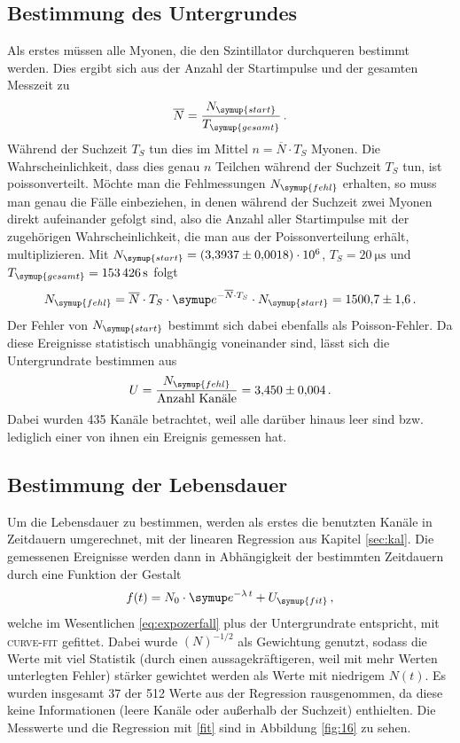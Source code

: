 \documentclass[
  bibliography=totoc,     %
  captions=tableheading,  %
  titlepage=firstiscover, %
]{scrartcl}
\begin{document}
\subsection{Bestimmung des Untergrundes}
Als erstes müssen alle Myonen, die den Szintillator durchqueren bestimmt werden.
Dies ergibt sich aus der Anzahl der Startimpulse und der gesamten Messzeit zu
\begin{equation}
  \overline{N} = \frac{N_{\symup{start}}}{T_{\symup{gesamt}}} \, .
\end{equation}
Während der Suchzeit $T_S$ tun dies im Mittel $n = \overline{N} \cdot T_S$ Myonen.
Die Wahrscheinlichkeit, dass dies genau $n$ Teilchen während der Suchzeit $T_S$
tun, ist poissonverteilt. Möchte man die Fehlmessungen $N_{\symup{fehl}}$
erhalten, so muss man genau die Fälle einbeziehen, in denen während der Suchzeit
zwei Myonen direkt aufeinander gefolgt sind, also die Anzahl aller Startimpulse
mit der zugehörigen Wahrscheinlichkeit, die man aus der Poissonverteilung
erhält, multiplizieren.
Mit $N_{\symup{start}} = \num{3.3937(18)e6}$, $T_S = \SI{20}{\micro\second}$ und $T_{\symup{gesamt}}
= \SI{153426}{\second}$ folgt
\begin{equation}
  N_{\symup{fehl}} = \overline{N} \cdot T_S \cdot \symup e^{- \overline{N} \cdot T_S}
  \cdot N_{\symup{start}} = \num{1500.7(16)} \, .
\end{equation}
Der Fehler von $N_{\symup{start}}$ bestimmt sich dabei ebenfalls als Poisson-Fehler.
Da diese Ereignisse statistisch unabhängig voneinander sind, lässt sich die Untergrundrate
bestimmen aus
\begin{equation}
  U = \frac{N_{\symup{fehl}}}{\text{Anzahl Kanäle}} = \num{3.450(4)} \, .
\end{equation}
Dabei wurden 435 Kanäle betrachtet, weil alle darüber hinaus leer sind bzw. lediglich
einer von ihnen ein Ereignis gemessen hat.

\subsection{Bestimmung der Lebensdauer}
Um die Lebensdauer zu bestimmen, werden als erstes die benutzten Kanäle in Zeitdauern
umgerechnet, mit der linearen Regression aus Kapitel \ref{sec:kal}. Die gemessenen
Ereignisse werden dann in Abhängigkeit der bestimmten Zeitdauern
durch eine Funktion der Gestalt
\begin{equation}
  f(t) = N_0 \cdot \symup e^{-\lambda \, t} + U_{\symup{fit}} \, ,
  \label{fit}
\end{equation}
welche im Wesentlichen \eqref{eq:expozerfall} plus der Untergrundrate entspricht,
mit \textsc{curve-fit} gefittet. Dabei wurde $(N)^{-1/2}$ als Gewichtung
genutzt, sodass die Werte mit viel Statistik (durch einen aussagekräftigeren, weil
mit mehr Werten unterlegten Fehler) stärker gewichtet werden als Werte mit niedrigem
$N(t)$. Es wurden insgesamt 37 der 512 Werte aus der Regression rausgenommen,
da diese keine Informationen (leere Kanäle oder außerhalb der Suchzeit) enthielten.
Die Messwerte und die Regression mit \eqref{fit} sind in
Abbildung \ref{fig:16} zu sehen.
\end{document}
